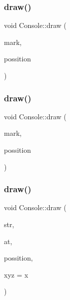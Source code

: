 \mbox{\label{classsc_1_1_console_a87065beb3ff9bcfb3eebc2d72586b3a2}} 
\subsubsection{\texorpdfstring{draw()}{draw()}\hspace{0.1cm}{\footnotesize\ttfamily [3/8]}}
{\footnotesize\ttfamily void Console\+::draw (\begin{DoxyParamCaption}\item[{const \mbox{\hyperlink{classsc_1_1_mark}{Mark}} \&}]{mark,  }\item[{\mbox{\hyperlink{classsc_1_1_vector2_d}{Vector2D}}}]{possition }\end{DoxyParamCaption})}

\mbox{\label{classsc_1_1_console_a139ec2f3c1296b5878a4a8f0da1c30cf}} 
\subsubsection{\texorpdfstring{draw()}{draw()}\hspace{0.1cm}{\footnotesize\ttfamily [4/8]}}
{\footnotesize\ttfamily void Console\+::draw (\begin{DoxyParamCaption}\item[{const \mbox{\hyperlink{classsc_1_1_w_mark}{W\+Mark}} \&}]{mark,  }\item[{\mbox{\hyperlink{classsc_1_1_vector2_d}{Vector2D}}}]{possition }\end{DoxyParamCaption})}

\mbox{\label{classsc_1_1_console_ae5305b5370392f5d798fdd466e017865}} 
\subsubsection{\texorpdfstring{draw()}{draw()}\hspace{0.1cm}{\footnotesize\ttfamily [5/8]}}
{\footnotesize\ttfamily void Console\+::draw (\begin{DoxyParamCaption}\item[{const std\+::string \&}]{str,  }\item[{W\+O\+RD}]{at,  }\item[{\mbox{\hyperlink{classsc_1_1_vector2_d}{Vector2D}}}]{possition,  }\item[{char}]{xyz = {\ttfamily \textquotesingle{}x\textquotesingle{}} }\end{DoxyParamCaption})}


